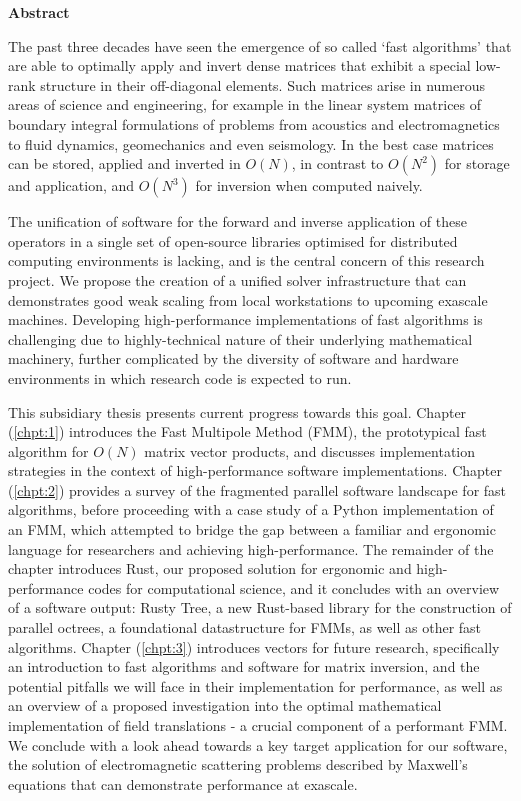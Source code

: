 \thispagestyle{plain}

\begin{center}
    \textbf{Abstract}
\end{center}

The past three decades have seen the emergence of so called `fast algorithms' that are able to optimally apply and invert dense matrices that exhibit a special low-rank structure in their off-diagonal elements. Such matrices arise in numerous areas of science and engineering, for example in the linear system matrices of boundary integral formulations of problems from acoustics and electromagnetics to fluid dynamics, geomechanics and even seismology. In the best case matrices can be stored, applied and inverted in $O(N)$, in contrast to $O(N^2)$ for storage and application, and $O(N^3)$ for inversion when computed naively.

The unification of software for the forward and inverse application of these operators in a single set of open-source libraries optimised for distributed computing environments is lacking, and is the central concern of this research project. We propose the creation of a unified solver infrastructure that can demonstrates good weak scaling from local workstations to upcoming exascale machines. Developing high-performance implementations of fast algorithms is challenging due to highly-technical nature of their underlying mathematical machinery, further complicated by the diversity of software and hardware environments in which research code is expected to run.

This subsidiary thesis presents current progress towards this goal. Chapter (\ref{chpt:1}) introduces the Fast Multipole Method (\gls{FMM}), the prototypical fast algorithm for $O(N)$ matrix vector products, and discusses implementation strategies in the context of high-performance software implementations. Chapter (\ref{chpt:2}) provides a survey of the fragmented parallel software landscape for fast algorithms, before proceeding with a case study of a Python implementation of an FMM, which attempted to bridge the gap between a familiar and ergonomic language for researchers and achieving high-performance. The remainder of the chapter introduces Rust, our proposed solution for ergonomic and high-performance codes for computational science, and it concludes with an overview of a software output: Rusty Tree, a new Rust-based library for the construction of parallel octrees, a foundational datastructure for \gls{FMM}s, as well as other fast algorithms. Chapter (\ref{chpt:3}) introduces vectors for future research, specifically an introduction to fast algorithms and software for matrix inversion, and the potential pitfalls we will face in their implementation for performance, as well as an overview of a proposed investigation into the optimal mathematical implementation of field translations - a crucial component of a performant FMM. We conclude with a look ahead towards a key target application for our software, the solution of electromagnetic scattering problems described by Maxwell's equations that can demonstrate performance at exascale.
